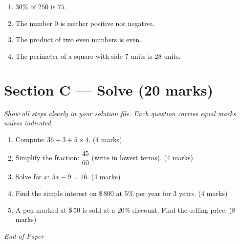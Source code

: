 \documentclass[12pt]{article}
\begin{document}
\begin{enumerate}[label=\arabic*., start=6]

\item $30\%$ of $250$ is $75$.

\item The number $0$ is neither positive nor negative.

\item The product of two even numbers is even.

\item The perimeter of a square with side $7$ units is $28$ units.



\end{enumerate}

\section*{Section C — Solve (20 marks)}
\textit{Show all steps clearly in your solution file. Each question carries equal marks unless indicated.}

\begin{enumerate}[label=\arabic*., start=11]

\item Compute: $36 \div 3 + 5 \times 4$.  \hfill (4 marks)

\item Simplify the fraction: $\dfrac{45}{60}$ (write in lowest terms).  \hfill (4 marks)

\item Solve for $x$: $5x - 9 = 16$.  \hfill (4 marks)

\item Find the simple interest on \$\,$800$ at $5\%$ per year for $3$ years. \hfill (4 marks)


\item A pen marked at \$\,$50$ is sold at a $20\%$ discount. Find the selling price. \hfill (8 marks)


\end{enumerate}

\vfill
\noindent\textit{End of Paper}
\end{document}
